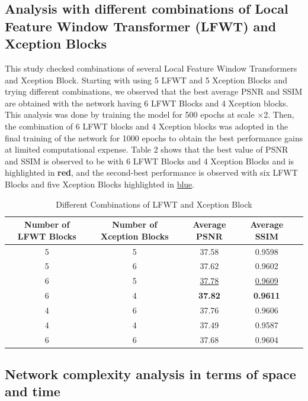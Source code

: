 \documentclass[twocolumn]{svjour3}          %
\begin{document}
\subsection{Analysis with different combinations of Local Feature Window Transformer (LFWT) and Xception Blocks}

This study checked combinations of several Local Feature Window Transformers and Xception Block. Starting with using 5 LFWT and 5 Xception Blocks and trying different combinations, we observed that the best average PSNR and SSIM are obtained with the network having 6 LFWT Blocks and 4 Xception blocks. This analysis was done by training the model for 500 epochs at scale ×2. Then, the combination of 6 LFWT blocks and 4 Xception blocks was adopted in the final training of the network for 1000 epochs to obtain the best performance gains at limited computational expense. Table 2 shows that the best value of PSNR and SSIM is observed to be with 6 LFWT Blocks and 4 Xception Blocks and is highlighted in {\color{red}\textbf{red}}, and the second-best performance is observed with six LFWT Blocks and five Xception Blocks highlighted in {\color{blue}\underline{blue}}.

\begin{table}
  \centering
  \caption{Different Combinations of LFWT and Xception Block}
  \setlength{\tabcolsep}{3 pt}
  \begin{tabular}{|c|c|c|c|c|} %
    \hline
    \textbf{Number of LFWT Blocks} & \textbf{Number of Xception Blocks} & \textbf{Average PSNR} & \textbf{Average SSIM} \\
    \hline
    5   & 5   & 37.58   & 0.9598   \\
    5   & 6   & 37.62   & 0.9602   \\
    6   & 5   & {\color{blue}\underline{37.78}}   & {\color{blue}\underline{0.9609}}   \\
    6   & 4   & {\color{red}\textbf{37.82}}   & {\color{red}\textbf{0.9611}}   \\
    4   & 6   & 37.76   & 0.9606   \\    
    4   & 4   & 37.49   & 0.9587   \\
    6   & 6   & 37.68   & 0.9604   \\
    \hline
  \end{tabular}
\end{table}

\subsection{Network complexity analysis in terms of space and time}
\end{document}
